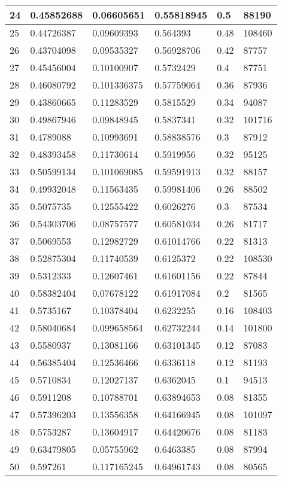 \begin{longtable}{|l|l|l|l|l|l|}
24 & 0.45852688 & 0.06605651 & 0.55818945 & 0.5 & 88190 \\ \hline 
25 & 0.44726387 & 0.09609393 & 0.564393 & 0.48 & 108460 \\ \hline 
26 & 0.43704098 & 0.09535327 & 0.56928706 & 0.42 & 87757 \\ \hline 
27 & 0.45456004 & 0.10100907 & 0.5732429 & 0.4 & 87751 \\ \hline 
28 & 0.46080792 & 0.101336375 & 0.57759064 & 0.36 & 87936 \\ \hline 
29 & 0.43860665 & 0.11283529 & 0.5815529 & 0.34 & 94087 \\ \hline 
30 & 0.49867946 & 0.09848945 & 0.5837341 & 0.32 & 101716 \\ \hline 
31 & 0.4789088 & 0.10993691 & 0.58838576 & 0.3 & 87912 \\ \hline 
32 & 0.48393458 & 0.11730614 & 0.5919956 & 0.32 & 95125 \\ \hline 
33 & 0.50599134 & 0.101069085 & 0.59591913 & 0.32 & 88157 \\ \hline 
34 & 0.49932048 & 0.11563435 & 0.59981406 & 0.26 & 88502 \\ \hline 
35 & 0.5075735 & 0.12555422 & 0.6026276 & 0.3 & 87534 \\ \hline 
36 & 0.54303706 & 0.08757577 & 0.60581034 & 0.26 & 81717 \\ \hline 
37 & 0.5069553 & 0.12982729 & 0.61014766 & 0.22 & 81313 \\ \hline 
38 & 0.52875304 & 0.11740539 & 0.6125372 & 0.22 & 108530 \\ \hline 
39 & 0.5312333 & 0.12607461 & 0.61601156 & 0.22 & 87844 \\ \hline 
40 & 0.58382404 & 0.07678122 & 0.61917084 & 0.2 & 81565 \\ \hline 
41 & 0.5735167 & 0.10378404 & 0.6232255 & 0.16 & 108403 \\ \hline 
42 & 0.58040684 & 0.099658564 & 0.62732244 & 0.14 & 101800 \\ \hline 
43 & 0.5580937 & 0.13081166 & 0.63101345 & 0.12 & 87083 \\ \hline 
44 & 0.56385404 & 0.12536466 & 0.6336118 & 0.12 & 81193 \\ \hline 
45 & 0.5710834 & 0.12027137 & 0.6362045 & 0.1 & 94513 \\ \hline 
46 & 0.5911208 & 0.10788701 & 0.63894653 & 0.08 & 81355 \\ \hline 
47 & 0.57396203 & 0.13556358 & 0.64166945 & 0.08 & 101097 \\ \hline 
48 & 0.5753287 & 0.13604917 & 0.64420676 & 0.08 & 81183 \\ \hline 
49 & 0.63479805 & 0.05755962 & 0.6463385 & 0.08 & 87994 \\ \hline 
50 & 0.597261 & 0.117165245 & 0.64961743 & 0.08 & 80565 \\ \hline 
\end{longtable}